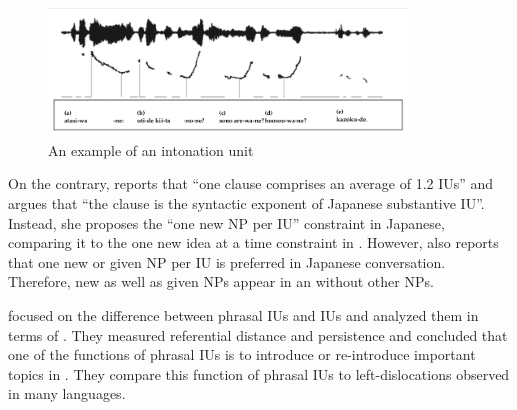 \begin{figure}
 \centering
 \includegraphics[width=0.85\textwidth]{sounds/iwasaki_IU.png}
 \caption{An example of an intonation unit \cite[109]{iwasaki08}}
 \label{IUExF}
\end{figure}


On the contrary,  reports that
``one clause comprises an average of 1.2 IUs''
and argues that
``the clause is the syntactic exponent of Japanese substantive IU''.
Instead, she proposes the ``one new NP per IU'' constraint in Japanese,
comparing it to the one new idea at a time constraint in .
However,  also reports that
one new or given NP per IU is preferred in Japanese conversation.
Therefore,
new as well as given NPs appear in an 
without other NPs.




 focused on the difference between
phrasal IUs and  IUs and
analyzed them in terms of .
They measured referential distance and persistence \cite{givon83} and concluded that
one of the functions of phrasal IUs is to introduce or re-introduce
important topics in .
They compare this function of phrasal IUs to left-dislocations observed in many languages.

%



